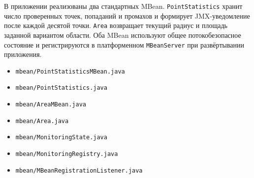 \documentclass[a4paper,14pt]{extarticle}
\begin{document}
В приложении реализованы два стандартных MBean. \texttt{PointStatistics} хранит число проверенных точек, попаданий и промахов и формирует JMX-уведомление после каждой десятой точки. \texttt{Area} возвращает текущий радиус и площадь заданной вариантом области. Оба MBean используют общее потокобезопасное состояние и регистрируются в платформенном \texttt{MBeanServer} при развёртывании приложения.

\begin{itemize}
    \item \texttt{mbean/PointStatisticsMBean.java}
\end{itemize}


\begin{itemize}
    \item \texttt{mbean/PointStatistics.java}
\end{itemize}


\begin{itemize}
    \item \texttt{mbean/AreaMBean.java}
\end{itemize}


\begin{itemize}
    \item \texttt{mbean/Area.java}
\end{itemize}


\begin{itemize}
    \item \texttt{mbean/MonitoringState.java}
\end{itemize}


\begin{itemize}
    \item \texttt{mbean/MonitoringRegistry.java}
\end{itemize}


\begin{itemize}
    \item \texttt{mbean/MBeanRegistrationListener.java}
\end{itemize}

\end{document}
